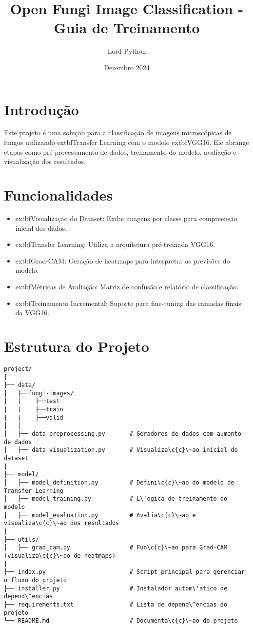 \documentclass{article}
\title{Open Fungi Image Classification - Guia de Treinamento}
\author{Lord Python}
\date{Dezembro 2024}
\begin{document}
\maketitle

\section{Introdu\c{c}\~ao}
Este projeto \'{e} uma solu\c{c}\~ao para a classifica\c{c}\~ao de imagens microsc\'opicas de fungos utilizando 	extbf{Transfer Learning} com o modelo 	extbf{VGG16}. Ele abrange etapas como pr\'e-processamento de dados, treinamento do modelo, avalia\c{c}\~ao e visualiza\c{c}\~ao dos resultados.

\section{Funcionalidades}
\begin{itemize}
    \item 	extbf{Visualiza\c{c}\~ao do Dataset}: Exibe imagens por classe para compreens\~ao inicial dos dados.
    \item 	extbf{Transfer Learning}: Utiliza a arquitetura pr\'e-treinada VGG16.
    \item 	extbf{Grad-CAM}: Gera\c{c}\~ao de heatmaps para interpretar as previs\~oes do modelo.
    \item 	extbf{M\'etricas de Avalia\c{c}\~ao}: Matriz de confus\~ao e relat\'orio de classifica\c{c}\~ao.
    \item 	extbf{Treinamento Incremental}: Suporte para fine-tuning das camadas finais da VGG16.
\end{itemize}

\section{Estrutura do Projeto}
\begin{verbatim}
project/
|
├── data/
│   ├──fungi-images/
│   │    ├──test
|   |    ├──train
|   |    ├──valid  
│   │
│   ├── data_preprocessing.py       # Geradores de dados com aumento de dados
│   ├── data_visualization.py       # Visualiza\c{c}\~ao inicial do dataset
|
├── model/
│   ├── model_definition.py         # Defini\c{c}\~ao do modelo de Transfer Learning
│   ├── model_training.py           # L\'ogica de treinamento do modelo
│   ├── model_evaluation.py         # Avalia\c{c}\~ao e visualiza\c{c}\~ao dos resultados
|
├── utils/
│   ├── grad_cam.py                 # Fun\c{c}\~ao para Grad-CAM (visualiza\c{c}\~ao de heatmaps)
|
├── index.py                        # Script principal para gerenciar o fluxo do projeto
├── installer.py                    # Instalador autom\'atico de depend\^encias
├── requirements.txt                # Lista de depend\^encias do projeto
└── README.md                       # Documenta\c{c}\~ao do projeto
\end{verbatim}
\end{document}
